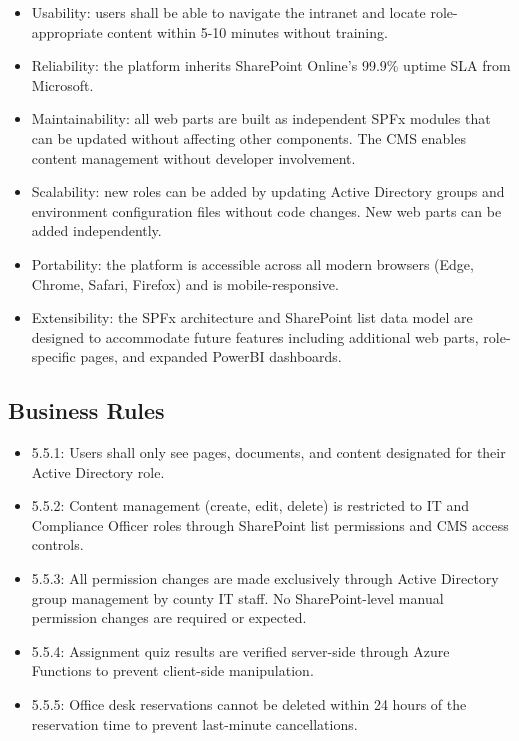 \documentclass[12pt]{article}
\begin{document}
\begin{itemize}[leftmargin=*]
\item  Usability: users shall be able to navigate the intranet and locate role-appropriate content within 5-10 minutes without training.
\end{itemize}

\begin{itemize}[leftmargin=*]
\item  Reliability: the platform inherits SharePoint Online's 99.9\% uptime SLA from Microsoft.
\item  Maintainability: all web parts are built as independent SPFx modules that can be updated without affecting other components. The CMS enables content management without developer involvement.
\item  Scalability: new roles can be added by updating Active Directory groups and environment configuration files without code changes. New web parts can be added independently.
\item  Portability: the platform is accessible across all modern browsers (Edge, Chrome, Safari, Firefox) and is mobile-responsive.
\item  Extensibility: the SPFx architecture and SharePoint list data model are designed to accommodate future features including additional web parts, role-specific pages, and expanded PowerBI dashboards.
\end{itemize}

\subsection{Business Rules}

\begin{itemize}[leftmargin=*]
\item  5.5.1: Users shall only see pages, documents, and content designated for their Active Directory role.
\item  5.5.2: Content management (create, edit, delete) is restricted to IT and Compliance Officer roles through SharePoint list permissions and CMS access controls.
\item  5.5.3: All permission changes are made exclusively through Active Directory group management by county IT staff. No SharePoint-level manual permission changes are required or expected.
\item  5.5.4: Assignment quiz results are verified server-side through Azure Functions to prevent client-side manipulation.
\item  5.5.5: Office desk reservations cannot be deleted within 24 hours of the reservation time to prevent last-minute cancellations.
\end{itemize}
\end{document}
